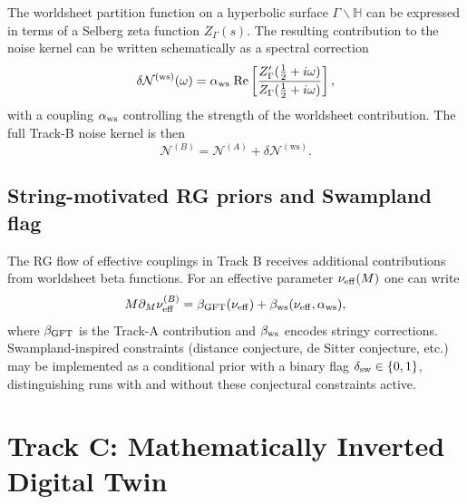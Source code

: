 \documentclass[11pt]{article}
\begin{document}
The worldsheet partition function on a hyperbolic surface $\Gamma\backslash\mathbb{H}$ can be expressed in terms of a Selberg zeta function $Z_\Gamma(s)$. The resulting contribution to the noise kernel can be written schematically as a spectral correction
\begin{equation}
  \delta \mathcal{N}^{(\mathrm{ws})}(\omega)
  = \alpha_{\rm ws}\; \mathrm{Re}\left[\frac{Z_\Gamma'(\tfrac{1}{2} + i\omega)}{Z_\Gamma(\tfrac{1}{2} + i\omega)}\right],
\end{equation}
with a coupling $\alpha_{\rm ws}$ controlling the strength of the worldsheet contribution. The full Track-B noise kernel is then
\begin{equation}
  \mathcal{N}^{(B)} = \mathcal{N}^{(A)} + \delta \mathcal{N}^{(\mathrm{ws})}.
\end{equation}

\subsection{String-motivated RG priors and Swampland flag}

The RG flow of effective couplings in Track B receives additional contributions from worldsheet beta functions. For an effective parameter $\nu_{\rm eff}(M)$ one can write
\begin{equation}
  M\partial_M \nu_{\rm eff}^{(B)}
  = \beta_{\rm GFT}(\nu_{\rm eff}) + \beta_{\rm ws}(\nu_{\rm eff}, \alpha_{\rm ws}),
\end{equation}
where $\beta_{\rm GFT}$ is the Track-A contribution and $\beta_{\rm ws}$ encodes stringy corrections. Swampland-inspired constraints (distance conjecture, de Sitter conjecture, etc.) may be implemented as a conditional prior with a binary flag $\delta_{\rm sw} \in \{0,1\}$, distinguishing runs with and without these conjectural constraints active.

\section{Track C: Mathematically Inverted Digital Twin}
\end{document}
